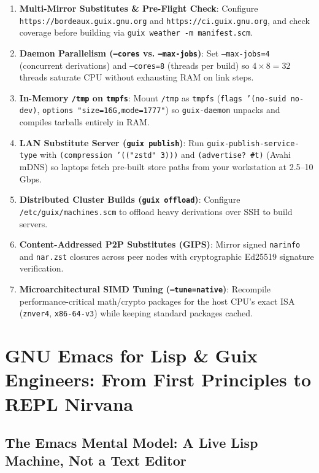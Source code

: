 \documentclass[11pt,oneside]{book}
\begin{document}
\begin{enumerate}
  \item \textbf{Multi-Mirror Substitutes \& Pre-Flight Check}: Configure \texttt{https://bordeaux.guix.gnu.org} and \texttt{https://ci.guix.gnu.org}, and check coverage before building via \texttt{guix weather -m manifest.scm}.
  \item \textbf{Daemon Parallelism (\texttt{--cores} vs. \texttt{--max-jobs})}: Set \texttt{--max-jobs=4} (concurrent derivations) and \texttt{--cores=8} (threads per build) so $4 \times 8 = 32$ threads saturate CPU without exhausting RAM on link steps.
  \item \textbf{In-Memory \texttt{/tmp} on \texttt{tmpfs}}: Mount \texttt{/tmp} as \texttt{tmpfs} (\texttt{flags '(no-suid no-dev)}, \texttt{options "size=16G,mode=1777"}) so \texttt{guix-daemon} unpacks and compiles tarballs entirely in RAM.
  \item \textbf{LAN Substitute Server (\texttt{guix publish})}: Run \texttt{guix-publish-service-type} with \texttt{(compression '(("zstd" 3)))} and \texttt{(advertise? \#t)} (Avahi mDNS) so laptops fetch pre-built store paths from your workstation at 2.5--10 Gbps.
  \item \textbf{Distributed Cluster Builds (\texttt{guix offload})}: Configure \texttt{/etc/guix/machines.scm} to offload heavy derivations over SSH to build servers.
  \item \textbf{Content-Addressed P2P Substitutes (GIPS)}: Mirror signed \texttt{narinfo} and \texttt{nar.zst} closures across peer nodes with cryptographic Ed25519 signature verification.
  \item \textbf{Microarchitectural SIMD Tuning (\texttt{--tune=native})}: Recompile performance-critical math/crypto packages for the host CPU's exact ISA (\texttt{znver4}, \texttt{x86-64-v3}) while keeping standard packages cached.
\end{enumerate}


\chapter{GNU Emacs for Lisp \& Guix Engineers: From First Principles to REPL Nirvana}

\section{The Emacs Mental Model: A Live Lisp Machine, Not a Text Editor}
\end{document}
